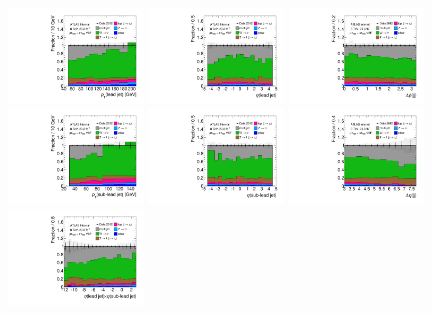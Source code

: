 \begin{figure}[tp]
  \includegraphics[width=0.32\textwidth]{figures/rx/vbf-mvaSR/jet-1-pt}
  \includegraphics[width=0.32\textwidth]{figures/rx/vbf-mvaSR/jet-1-eta}
  \includegraphics[width=0.32\textwidth]{figures/rx/vbf-mvaSR/jets-dphi}
  \includegraphics[width=0.32\textwidth]{figures/rx/vbf-mvaSR/jet-2-pt}
  \includegraphics[width=0.32\textwidth]{figures/rx/vbf-mvaSR/jet-2-eta}
  \includegraphics[width=0.32\textwidth]{figures/rx/vbf-mvaSR/jets-deta}
  \includegraphics[width=0.32\textwidth]{figures/rx/vbf-mvaSR/jets-etaprod}

\end{figure}
